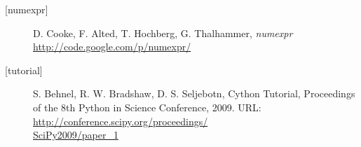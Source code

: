 \documentclass[letterpaper,11pt,english]{article}
\def\emph#1{{\sl #1}}
\begin{document}
\begin{description}
\item[\hypertarget{numexpr}{}[numexpr{]}]
D. Cooke, F. Alted, T. Hochberg, G. Thalhammer, \emph{numexpr}
\href{http://code.google.com/p/numexpr/}{http://code.google.com/p/numexpr/}


\item[\hypertarget{tutorial}{}[tutorial{]}]
S. Behnel, R. W. Bradshaw, D. S. Seljebotn, Cython Tutorial,
Proceedings of the 8th Python in Science
Conference, 2009. URL:
\href{http://conference.scipy.org/proceedings/SciPy2009/paper\_1}{http://conference.scipy.org/proceedings/\\ SciPy2009/paper\_1}


\end{description}
\end{document}
